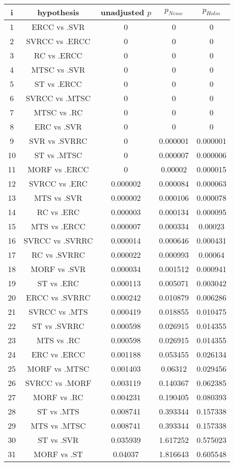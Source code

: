 \documentclass[a4paper,10pt]{article}
\begin{document}
\begin{landscape}
\begin{table}[!htp]
\centering\scriptsize
\begin{tabular}{ccccc}
i&hypothesis&unadjusted $p$&$p_{Neme}$&$p_{Holm}$\\
\hline1&ERCC vs .SVR&0&0&0\\
2&SVRCC vs .ERCC&0&0&0\\
3&RC vs .ERCC&0&0&0\\
4&MTSC vs .SVR&0&0&0\\
5&ST vs .ERCC&0&0&0\\
6&SVRCC vs .MTSC&0&0&0\\
7&MTSC vs .RC&0&0&0\\
8&ERC vs .SVR&0&0&0\\
9&SVR vs .SVRRC&0&0.000001&0.000001\\
10&ST vs .MTSC&0&0.000007&0.000006\\
11&MORF vs .ERCC&0&0.00002&0.000015\\
12&SVRCC vs .ERC&0.000002&0.000084&0.000063\\
13&MTS vs .SVR&0.000002&0.000106&0.000078\\
14&RC vs .ERC&0.000003&0.000134&0.000095\\
15&MTS vs .ERCC&0.000007&0.000334&0.00023\\
16&SVRCC vs .SVRRC&0.000014&0.000646&0.000431\\
17&RC vs .SVRRC&0.000022&0.000993&0.00064\\
18&MORF vs .SVR&0.000034&0.001512&0.000941\\
19&ST vs .ERC&0.000113&0.005071&0.003042\\
20&ERCC vs .SVRRC&0.000242&0.010879&0.006286\\
21&SVRCC vs .MTS&0.000419&0.018855&0.010475\\
22&ST vs .SVRRC&0.000598&0.026915&0.014355\\
23&MTS vs .RC&0.000598&0.026915&0.014355\\
24&ERC vs .ERCC&0.001188&0.053455&0.026134\\
25&MORF vs .MTSC&0.001403&0.06312&0.029456\\
26&SVRCC vs .MORF&0.003119&0.140367&0.062385\\
27&MORF vs .RC&0.004231&0.190405&0.080393\\
28&ST vs .MTS&0.008741&0.393344&0.157338\\
29&MTS vs .MTSC&0.008741&0.393344&0.157338\\
30&ST vs .SVR&0.035939&1.617252&0.575023\\
31&MORF vs .ST&0.04037&1.816643&0.605548\\

\end{tabular}
\end{table}
\end{landscape}
\end{document}
